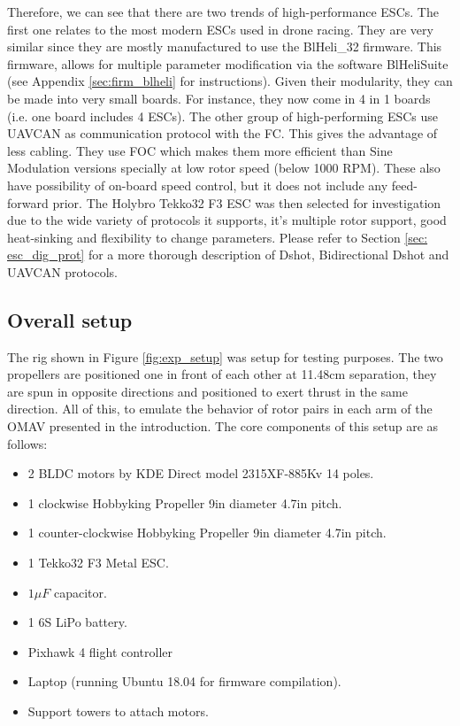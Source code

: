Therefore, we can see that there are two trends of high-performance ESCs. The first one relates to the most modern ESCs used in drone racing. They are very similar since they are mostly manufactured to use the BlHeli\_32 firmware. This firmware, allows for multiple parameter modification via the software BlHeliSuite (see Appendix \ref{sec:firm_blheli} for instructions). Given their modularity, they can be made into very small boards. For instance, they now come in 4 in 1 boards (i.e. one board includes 4 ESCs). The other group of high-performing ESCs use UAVCAN as communication protocol with the FC. This gives the advantage of less cabling. They use FOC which makes them more efficient than Sine Modulation versions specially at low rotor speed (below 1000 RPM). These also have possibility of on-board speed control, but it does not include any feed-forward prior.  The Holybro Tekko32 F3 ESC was then selected for investigation due to the wide variety of protocols it supports, it's multiple rotor support, good heat-sinking and flexibility to change parameters. Please refer to Section \ref{sec: esc_dig_prot} for a more thorough description of Dshot, Bidirectional Dshot and UAVCAN protocols.

\subsection{Overall setup}

The rig shown in Figure \ref{fig:exp_setup} was setup for testing purposes. The two propellers are positioned one in front of each other at 11.48cm separation, they are spun in opposite directions and positioned to exert thrust in the same direction. All of this, to emulate the behavior of rotor pairs in each arm of the OMAV presented in the introduction. The core components of this setup are as follows:
\begin{itemize}
	\item 2 BLDC motors by KDE Direct model 2315XF-885Kv 14 poles.
	\item 1 clockwise Hobbyking Propeller 9in diameter 4.7in pitch.
	\item 1 counter-clockwise Hobbyking Propeller 9in diameter 4.7in pitch.
	\item 1 Tekko32 F3 Metal ESC.
	\item $1\mu F$ capacitor.
	\item 1 6S LiPo battery.
	\item Pixhawk 4 flight controller
	\item Laptop (running Ubuntu 18.04 for firmware compilation).
	\item Support towers to attach motors.
\end{itemize}

